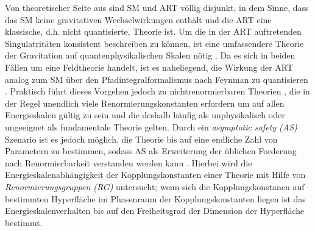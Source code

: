   Von theoretischer Seite aus sind SM und ART völlig disjunkt, in dem Sinne, 
  dass das SM keine gravitativen Wechselwirkungen enthält und die ART eine 
  klassische, d.h. nicht quantisierte, Theorie ist. Um die in der ART 
  auftretenden Singulatritäten konsistent beschreiben zu können, ist eine 
  umfassendere Theorie der Gravitation auf quantenphysikalischen Skalen nötig 
  \cite{GR_Introductory}. Da es sich in beiden 
  Fällen um eine Feldtheorie handelt, ist es naheliegend, die Wirkung der ART 
  analog zum SM über den Pfadintegralformalismus nach Feynman zu quantisieren 
  \cite{GR_Hawking}. Praktisch führt dieses Vorgehen jedoch zu 
  nichtrenormierbaren Theorien \cite{GR_Weinberg}, die in der Regel unendlich 
  viele Renormierungskonstanten erfordern um auf allen Energieskalen gültig 
  zu sein und die deshalb häufig als unphysikalisch oder ungeeignet als 
  fundamentale Theorie gelten. Durch ein \textit{asymptotic safety (AS)} 
  Szenario ist es jedoch möglich, die Theorie bis auf eine endliche Zahl von 
  Parametern zu bestimmen, sodass AS als Erweiterung der üblichen Forderung 
  nach Renormierbarkeit verstanden werden kann \cite{GR_Weinberg}
  \cite{Weinberg:1976}. Hierbei 
  wird die Energieskalenabhängigkeit der Kopplungskonstanten einer Theorie 
  mit Hilfe von \textit{Renormierungsgruppen (RG)} untersucht; wenn sich 
  die Kopplungskonstanen auf bestimmten Hyperfläche im Phasenraum der 
  Kopplungskonstanten liegen ist das Energieskalenverhalten bis auf den  
  Freiheitsgrad der Dimension der Hyperfläche bestimmt.
  
 
    